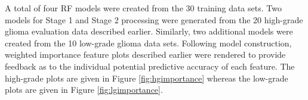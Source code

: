 \documentclass[preprint,authoryear,review,12pt]{elsarticle}
\begin{document}
{A total of four RF models were created from the 30 training data 
sets. Two models for Stage 1 and Stage 2 processing were generated from the 
20 high-grade glioma evaluation data described earlier.  Similarly, two
additional models were created from the 10 low-grade glioma data sets.  Following
model construction, weighted importance feature plots described earlier were 
rendered to provide feedback as to the individual potential predictive accuracy
of each feature.  The high-grade plots are given in Figure \ref{fig:hgimportance}
whereas the low-grade plots are given in Figure \ref{fig:lgimportance}.

\begin{figure}
\end{figure}}
\end{document}
